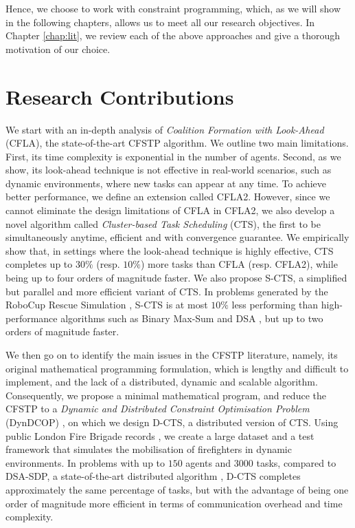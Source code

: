 Hence, we choose to work with constraint programming, which, as we will show in the
following chapters, allows us to meet all our research objectives. In Chapter
\ref{chap:lit}, we review each of the above approaches and give a thorough motivation of
our choice.

\section{Research Contributions}\label{sec:contrib}

We start with an in-depth analysis of \emph{Coalition Formation with Look-Ahead} (CFLA),
the state-of-the-art CFSTP algorithm. We outline two main limitations. First, its time
complexity is exponential in the number of agents. Second, as we show, its look-ahead
technique is not effective in real-world scenarios, such as dynamic environments, where
new tasks can appear at any time. To achieve better performance, we define an extension
called CFLA2. However, since we cannot eliminate the design limitations of CFLA in CFLA2,
we also develop a novel algorithm called \emph{Cluster-based Task Scheduling} (CTS), the
first to be simultaneously anytime, efficient and with convergence guarantee. We
empirically show that, in settings where the look-ahead technique is highly effective, CTS
completes up to $30\%$ (resp. $10\%$) more tasks than CFLA (resp. CFLA2), while being up
to four orders of magnitude faster. We also propose S-CTS, a simplified but parallel and
more efficient variant of CTS. In problems generated by the RoboCup Rescue Simulation
\cite{rcr2001}, S-CTS is at most $10\%$ less performing than high-performance algorithms
such as Binary Max-Sum \cite{pujol-gonzalez2014binary} and DSA \cite{zhang2005}, but up to
two orders of magnitude faster.

We then go on to identify the main issues in the CFSTP literature, namely, its original
mathematical programming formulation, which is lengthy and difficult to implement, and the
lack of a distributed, dynamic and scalable algorithm. Consequently, we propose a minimal
mathematical program, and reduce the CFSTP to a \emph{Dynamic and Distributed Constraint
Optimisation Problem} (DynDCOP) \cite{fioretto2018survey}, on which we design D-CTS, a
distributed version of CTS. Using public London Fire Brigade records
\cite{lfb-incident,lfb-mobilisation}, we create a large dataset and a test framework that
simulates the mobilisation of firefighters in dynamic environments. In problems with up to
$150$ agents and $3000$ tasks, compared to DSA-SDP, a state-of-the-art distributed
algorithm \cite{zivan2014}, D-CTS completes approximately the same percentage of tasks,
but with the advantage of being one order of magnitude more efficient in terms of
communication overhead and time complexity.

